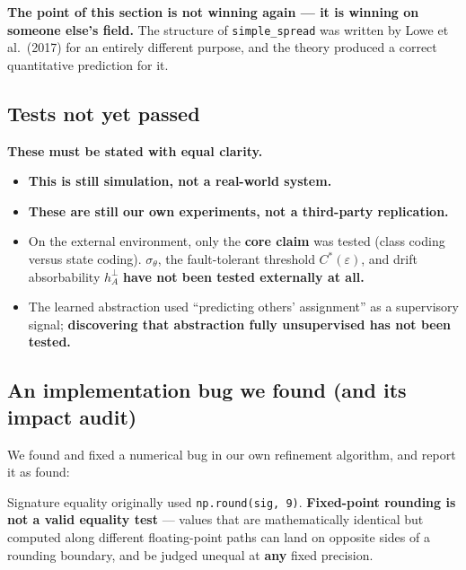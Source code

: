\documentclass[11pt]{article}
\providecommand{\tightlist}{%
  \setlength{\itemsep}{0pt}\setlength{\parskip}{0pt}}
\renewenvironment{quote}
  {\def\FrameCommand{{\color{gray!60}\vrule width 2pt}\hspace{8pt}}%
   \MakeFramed{\advance\hsize-\width \FrameRestore}\begin{itshape}}
  {\end{itshape}\endMakeFramed}
\begin{document}
\begin{quote}
\textbf{The point of this section is not winning again --- it is winning on someone else's field.} The structure of \texttt{simple\_spread} was written by Lowe et al.~(2017) for an entirely different purpose, and the theory produced a correct quantitative prediction for it.
\end{quote}

\hypertarget{tests-not-yet-passed}{%
\subsection{Tests not yet passed}\label{tests-not-yet-passed}}

\textbf{These must be stated with equal clarity.}

\begin{itemize}
\tightlist
\item
  \textbf{This is still simulation, not a real-world system.}
\item
  \textbf{These are still our own experiments, not a third-party replication.}
\item
  On the external environment, only the \textbf{core claim} was tested (class coding versus state coding). \(\sigma_\theta\), the fault-tolerant threshold \(C^*(\varepsilon)\), and drift absorbability \(h_A^\perp\) \textbf{have not been tested externally at all.}
\item
  The learned abstraction used ``predicting others' assignment'' as a supervisory signal; \textbf{discovering that abstraction fully unsupervised has not been tested.}
\end{itemize}

\hypertarget{an-implementation-bug-we-found-and-its-impact-audit}{%
\subsection{An implementation bug we found (and its impact audit)}\label{an-implementation-bug-we-found-and-its-impact-audit}}

We found and fixed a numerical bug in our own refinement algorithm, and report it as found:

Signature equality originally used \texttt{np.round(sig,\ 9)}. \textbf{Fixed-point rounding is not a valid equality test} --- values that are mathematically identical but computed along different floating-point paths can land on opposite sides of a rounding boundary, and be judged unequal at \textbf{any} fixed precision.
\end{document}
